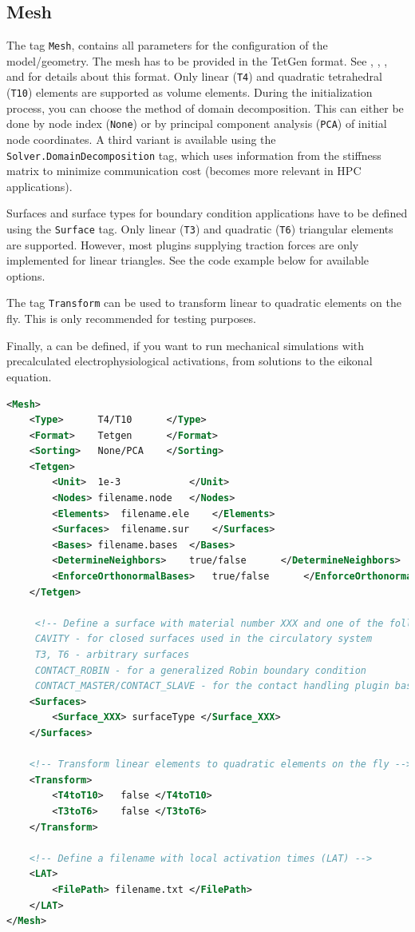 \subsection{Mesh}
\label{settings:Mesh}

The tag \verb+Mesh+, contains all parameters for the configuration of the model/geometry.
The mesh has to be provided in the TetGen format.
See , , , and  for details about this format.
Only linear (\verb+T4+) and quadratic tetrahedral (\verb+T10+) elements are supported as volume elements.
During the initialization process, you can choose the method of domain decomposition.
This can either be done by node index (\verb+None+) or by principal component analysis (\verb+PCA+) of initial node coordinates.
A third variant is available using the \verb|Solver.DomainDecomposition| tag, which uses information from the stiffness matrix to minimize communication cost (becomes more relevant in HPC applications).

Surfaces and surface types for boundary condition applications have to be defined using the \verb|Surface| tag.
Only linear (\verb|T3|) and quadratic (\verb|T6|) triangular elements are supported.
However, most plugins supplying traction forces are only implemented for linear triangles.
See the code example below for available options.

The tag \verb|Transform| can be used to transform linear to quadratic elements on the fly.
This is only recommended for testing purposes.

Finally, a  can be defined, if you want to run mechanical simulations with precalculated electrophysiological activations, \eg from solutions to the eikonal equation.

\begin{lstlisting}[language=XML,caption=.xml settings for mesh initialization]
<Mesh>
    <Type>		T4/T10 		</Type>
    <Format>	Tetgen 		</Format>
    <Sorting>	None/PCA	</Sorting>
    <Tetgen>
        <Unit>  1e-3			</Unit>
        <Nodes> filename.node	</Nodes>
        <Elements>  filename.ele 	</Elements>
        <Surfaces>  filename.sur 	</Surfaces>
        <Bases> filename.bases 	</Bases>
        <DetermineNeighbors>    true/false		</DetermineNeighbors>
        <EnforceOrthonormalBases>	true/false		</EnforceOrthonormalBases>
    </Tetgen>

     <!-- Define a surface with material number XXX and one of the following surface types: 
     CAVITY - for closed surfaces used in the circulatory system
     T3, T6 - arbitrary surfaces
     CONTACT_ROBIN - for a generalized Robin boundary condition
     CONTACT_MASTER/CONTACT_SLAVE - for the contact handling plugin based on Fritz et al. 2013 -->
    <Surfaces>
        <Surface_XXX> surfaceType </Surface_XXX>
    </Surfaces>

    <!-- Transform linear elements to quadratic elements on the fly -->
    <Transform>
    	<T4toT10> 	false </T4toT10>
    	<T3toT6> 	false </T3toT6>
    </Transform>

    <!-- Define a filename with local activation times (LAT) -->
    <LAT>
        <FilePath> filename.txt </FilePath>
    </LAT>
</Mesh>
\end{lstlisting}

